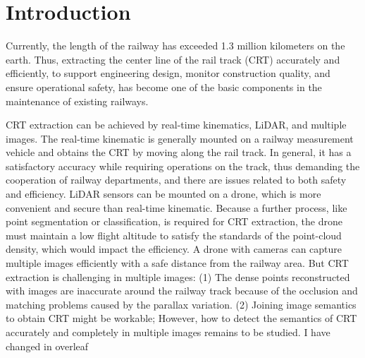 \section{Introduction}

Currently,
the length of the railway has exceeded 1.3 million kilometers on the earth.
Thus,
extracting the center line of the rail track (CRT) accurately and efficiently, 
to support engineering design, monitor construction quality, 
and ensure operational safety,
has become one of the basic components in the maintenance of existing railways.

CRT extraction can be achieved by real-time kinematics, LiDAR,
and multiple images.
The real-time kinematic is generally mounted on a railway measurement vehicle and obtains the CRT by moving along the rail track.
In general, 
it has a satisfactory accuracy while requiring operations on the track,
thus demanding the cooperation of railway departments, 
and there are issues related to both safety and efficiency.
LiDAR sensors can be mounted on a drone, 
which is more convenient and secure than real-time kinematic. 
Because a further process, 
like point segmentation or classification,
is required for CRT extraction,
the drone must maintain a low flight altitude to satisfy the standards of the point-cloud density,
which would impact the efficiency.
A drone with cameras can capture multiple images efficiently with a safe distance from the railway area.
But CRT extraction is challenging in multiple images:
(1) The dense points reconstructed with images are inaccurate around the railway track because of the occlusion and matching problems caused by the parallax variation.
(2) Joining image semantics to obtain CRT might be workable;
However,
how to detect the semantics of CRT accurately and completely in multiple images remains to be studied.
I have changed in overleaf












